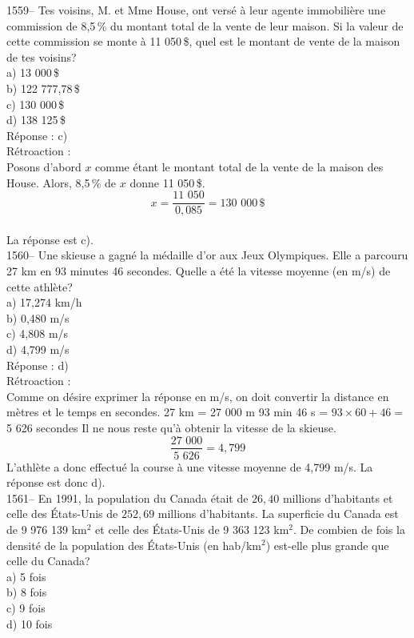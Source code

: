 1559-- Tes voisins, M. et Mme House, ont vers\'e \`a leur agente
immobili\`ere une commission de 8,5\,\% du montant total de  la
vente de leur maison. Si la valeur de cette commission se monte \`a
11 050\,\$, quel est le
montant de vente de la maison de tes voisins?\\
a) 13 000\,\$\\
b) 122 777,78\,\$\\
c) 130 000\,\$\\
d) 138 125\,\$\\

R\'eponse : c)\\

R\'etroaction  :\\
Posons d'abord $x$ comme \'etant le montant total de la vente de la
maison des House. Alors, {\textrm{8,5\,\% de $x$ donne }}11 050\,\$.
$$x=\frac{\textrm{11 050}}{0,085}={\textrm{130 000}}\,\$$$\\
La r\'eponse est c).\\

1560-- Une skieuse a gagn\'e la m\'edaille d'or aux Jeux Olympiques.
Elle a parcouru 27 km en 93 minutes 46 secondes. Quelle a
\'et\'e la vitesse moyenne (en m/s) de cette athl\`ete?\\
a) 17,274 km/h\\
b) 0,480 m/s \\
c) 4,808 m/s\\
d) 4,799 m/s\\

R\'eponse  : d)\\

R\'etroaction :\\
Comme on d\'esire exprimer la r\'eponse en m/s, on doit convertir la
distance en m\`etres et le temps en secondes. \vskip 15pt 27 km = 27
000 m \vskip 15pt 93 min 46 s = $93\times60+46=${\textrm{ 5 626}}
secondes \vskip 20pt \noindent Il ne nous reste qu'\`a obtenir la
vitesse de la skieuse.
$$\frac{\textrm{27 000}}{\textrm{5 626}}=4,799$$ L'athl\`ete a donc
effectu\'e
la course \`a une vitesse moyenne de 4,799 m/s. La r\'eponse est donc d).\\

1561-- En 1991, la population du Canada \'etait de $26,40$ millions
d'habitants et celle des \'Etats-Unis de $252,69$ millions
d'habitants. La superficie du Canada est de {\textrm{9 976 139}}
km$^2$ et celle des \'Etats-Unis de {\textrm{9 363 123}} km$^2$. De
combien de fois la densit\'e de la population des \'Etats-Unis (en
hab/{km$^2$}) est-elle plus grande
que celle du Canada?\\
a) 5 fois\\
b) 8 fois\\
c) 9 fois\\
d) 10 fois\\

